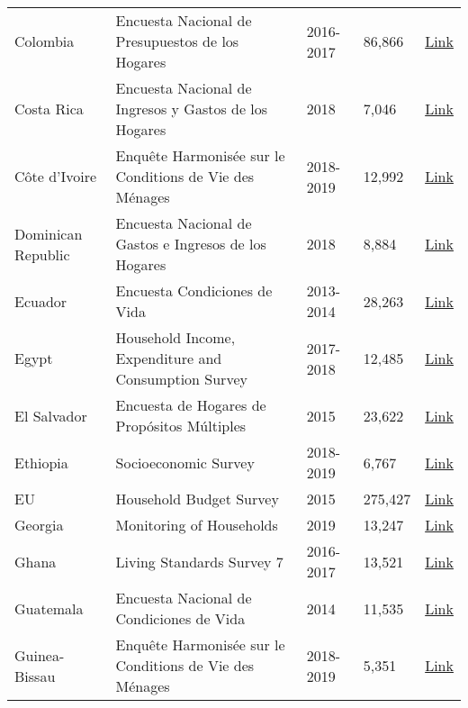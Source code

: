\begin{ThreePartTable}
\begin{longtable}[t]{l|p{8cm}|l|l|l}
        Colombia & Encuesta Nacional de Presupuestos de los Hogares & 2016-2017 &  86,866  & \href{https://www.dane.gov.co/index.php/estadisticas-por-tema/pobreza-y-condiciones-de-vida/encuesta-nacional-de-presupuestos-de-los-hogares-enph}{Link} \\ 
        Costa Rica & Encuesta Nacional de Ingresos y Gastos de los Hogares & 2018 &  7,046  & \href{https://inec.cr/estadisticas-fuentes/encuestas/encuesta-nacional-ingresos-gastos-los-hogares}{Link} \\ 
        Côte d'Ivoire & Enquête Harmonisée sur le Conditions de Vie des Ménages & 2018-2019 &  12,992  & \href{https://microdata.worldbank.org/index.php/catalog/4292/study-description}{Link} \\ 
        Dominican Republic & Encuesta Nacional de Gastos e Ingresos de los Hogares & 2018 &  8,884  & \href{https://archivo.one.gob.do/encuestas/enigh}{Link} \\ 
        Ecuador & Encuesta Condiciones de Vida & 2013-2014 &  28,263  & \href{https://aplicaciones3.ecuadorencifras.gob.ec/BIINEC-war/index.xhtml}{Link} \\ 
        Egypt & Household Income, Expenditure and Consumption Survey & 2017-2018 &  12,485  & \href{http://www.erfdataportal.com/index.php/catalog/129}{Link} \\ 
        El Salvador & Encuesta de Hogares de Propósitos Múltiples & 2015 &  23,622  & \href{http://www.digestyc.gob.sv/index.php/temas/des/ehpm.html}{Link} \\ 
        Ethiopia & Socioeconomic Survey & 2018-2019 &  6,767  & \href{https://microdata.worldbank.org/index.php/catalog/3823}{Link} \\ 
        EU & Household Budget Survey & 2015 &  275,427  & \href{https://ec.europa.eu/eurostat/web/microdata/household-budget-survey}{Link} \\ 
        Georgia & Monitoring of Households & 2019 &  13,247  & \href{https://www.geostat.ge/en/modules/categories/128/databases-of-2009-2016-integrated-household-survey-and-2017-households-income-and-expenditure-survey}{Link} \\ 
        Ghana & Living Standards Survey 7 & 2016-2017 &  13,521  & \href{https://www2.statsghana.gov.gh/nada/index.php/catalog/97/study-description}{Link} \\ 
        Guatemala & Encuesta Nacional de Condiciones de Vida & 2014 &  11,535  & \href{https://www.proyectoencovi.com/}{Link} \\ 
        Guinea-Bissau & Enquête Harmonisée sur le Conditions de Vie des Ménages & 2018-2019 &  5,351  & \href{https://microdata.worldbank.org/index.php/catalog/4293}{Link} \\ 

\end{longtable}
\end{ThreePartTable}
